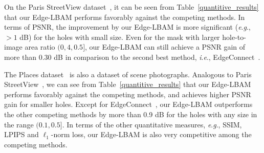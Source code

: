 \documentclass[10pt,journal,compsoc]{IEEEtran}
\newcommand{\ie}{\textit{i}.\textit{e}.}
\newcommand{\eg}{\textit{e}.\textit{g}.}
\begin{document}
%
%
%


On the Paris StreetView dataset~\cite{doersch2015makes}, it can be seen from Table~\ref{quantitive_results} that our Edge-LBAM performs favorably against the competing methods.
%
In terms of PSNR, the improvement by our Edge-LBAM is more significant (\eg, $> 1$ dB) for the holes with small size.
%
Even for the mask with larger hole-to-image area ratio $(0,4,0.5]$, our Edge-LBAM can still achieve a PSNR gain of more than $0.30$ dB in comparison to the second best method, \ie, EdgeConnect~\cite{nazeri2019edgeconnect}.




The Places dataset~\cite{zhou2017places} is also a dataset of scene photographs.
%
Analogous to Paris StreetView~\cite{doersch2015makes}, we can see from Table~\ref{quantitive_results} that our Edge-LBAM performs favorably against the competing methods, and achieves higher PSNR gain for smaller holes.
%
Except for EdgeConnect~\cite{nazeri2019edgeconnect}, our Edge-LBAM outperforms the other competing methods by more than 0.9 dB for the holes with any size in the range $(0.1, 0.5]$.
%
In terms of the other quantitative measures, \eg, SSIM, LPIPS and $\ell_1$-norm loss, our Edge-LBAM is also very competitive among the competing methods.
\end{document}
